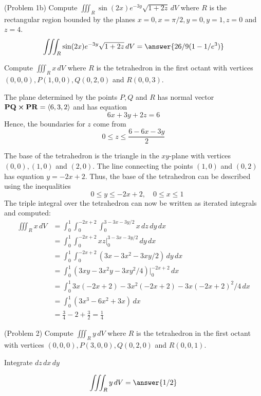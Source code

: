 \documentclass[handout]{ximera}
\begin{document}
\begin{problem}(Problem 1b)
Compute $\iiint_R \sin(2x)e^{-3y}\sqrt{1+ 2z} \, dV$ where $R$ is the rectangular region bounded by the 
planes $x = 0, x = \pi/2, y = 0, y = 1, z = 0$ and $z = 4$.\\
\[
\iiint_R \sin(2x)e^{-3y}\sqrt{1+ 2z} \, dV = \answer{26/9 (1 - 1/e^3)}
\]
\end{problem}

\begin{example}[Example 2]
Compute $\iiint_R x \, dV$ where $R$ is the tetrahedron in the first octant with 
vertices $(0,0,0), P(1, 0, 0), Q(0, 2, 0)$ and $R(0,0,3)$.


The plane determined by the points $P, Q$ and $R$ has normal vector $\mathbf{PQ} \boldsymbol\times \mathbf{PR} = \left\langle 6, 3, 2\right\rangle$
and has equation 
\[
6x + 3y + 2z = 6
\]
Hence, the boundaries for $z$ come from
\[
0 \leq z \leq \frac{6 - 6x - 3y}{2}
\]

The base of the tetrahedron is the triangle in the $xy$-plane with vertices $(0,0), (1,0)$ and $(2,0)$. 
The line connecting the points $(1,0)$ and $(0,2)$ has equation $y = -2x + 2$.
Thus, the base of the tetrahedron can be described using the inequalities
\[
\quad 0 \leq y \leq -2x+2, \quad 0 \leq x \leq 1
\]
The triple integral over the tetrahedron can now be written as iterated integrals and computed:
\begin{align*}
\iiint_R x \, dV & = \int_0^1 \int_0^{-2x+2} \int_0^{3 - 3x - 3y/2} x \, dz\, dy \, dx\\
                 & = \int_0^1 \int_0^{-2x+2}  xz\bigg|_0^{3 - 3x - 3y/2} \, dy \, dx\\
                 & = \int_0^1 \int_0^{-2x+2}  (3x - 3x^2 - 3xy/2) \, dy \, dx\\
                 &= \int_0^1   (3xy - 3x^2y - 3xy^2/4)\bigg|_0^{-2x+2} \, dx\\
                 &= \int_0^1 3x(-2x+2) -3x^2(-2x+2) -3x(-2x+2)^2/4 \, dx\\
                 &= \int_0^1   (3x^3 - 6x^2  +  3x)   \, dx\\
                 &= \frac34 - 2 + \frac32 = \frac14
\end{align*}  

\end{example}

\begin{problem}(Problem 2)
Compute $\iiint_R y \, dV$ where $R$ is the tetrahedron in the first octant with 
vertices $(0,0,0), P(3, 0, 0), Q(0, 2, 0)$ and $R(0,0,1)$.\\
\begin{hint}
Integrate $dz \, dx \, dy$
\end{hint}
\[
\iiint_R y \, dV = \answer{1/2}
\]
\end{problem}
\end{document}
